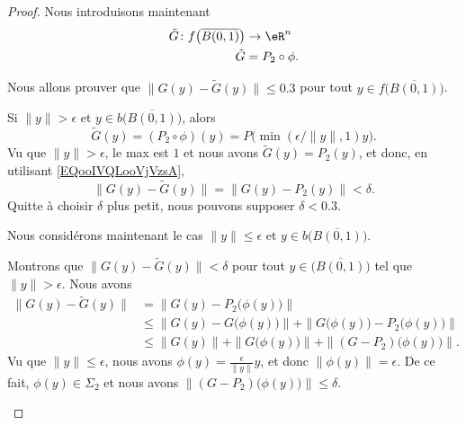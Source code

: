 \begin{proof}
	Nous introduisons maintenant
	\begin{equation}
		\begin{aligned}
			\tilde G\colon f\big( \overline{B(0,1)} \big) & \to \eR^n       \\
			\tilde G                                      & =P_2\circ \phi.
		\end{aligned}
	\end{equation}

	Nous allons prouver que \( \| G(y)-\tilde  G(y) \|\leq 0.3\) pour tout \( y\in f\big( \overline{B(0,1)} \big)\).
	\begin{subproof}
		\spitem[Si \( \| y \| > \epsilon\)]

		Si \( \| y \|>\epsilon\) et \( y\in b\big( \overline{B(0,1)} \big)\), alors
		\begin{equation}
			\tilde G(y)=(P_2\circ \phi)(y)=P\big( \min(\epsilon/\| y \|,1)y \big).
		\end{equation}
		Vu que \( \| y \|>\epsilon\), le max est \( 1\) et nous avons \( \tilde G(y)=P_2(y)\), et donc, en utilisant \eqref{EQooIVQLooVjVzsA},
		\begin{equation}
			\| G(y)-\tilde G(y) \|=\| G(y)-P_2(y) \|<\delta.
		\end{equation}
		Quitte à choisir \( \delta\) plus petit, nous pouvons supposer \( \delta<0.3\).

		Nous considérons maintenant le cas \( \| y \|\leq\epsilon\) et \( y\in b\big( \overline{B(0,1)} \big)\).


		Montrons que \( \| G(y)-\tilde G(y) \|<\delta\) pour tout \( y\in\big( \overline{B(0,1)} \big)\) tel que \( \| y \|>\epsilon\). Nous avons
		\begin{subequations}
			\begin{align}
				\| G(y)-\tilde G(y) \| & = \| G(y)-P_2\big( \phi(y) \big) \|                                                    \\
				                       & \leq \| G(y)-G\big( \phi(y) \big) \|+\| G\big( \phi(y) \big)-P_2\big( \phi(y) \big) \| \\
				                       & \leq \| G(y) \| + \| G\big( \phi(y) \big) \|+\| (G-P_2)\big( \phi(y) \big) \|.
			\end{align}
		\end{subequations}
		Vu que \( \| y \|\leq \epsilon\), nous avons \( \phi(y)=\frac{ \epsilon }{ \| y \| }y\), et donc \( \| \phi(y) \|=\epsilon\). De ce fait, \( \phi(y)\in \Sigma_2\) et nous avons \( \| (G-P_2)\big( \phi(y) \big) \|\leq \delta\).


\end{subproof}
\end{proof}
